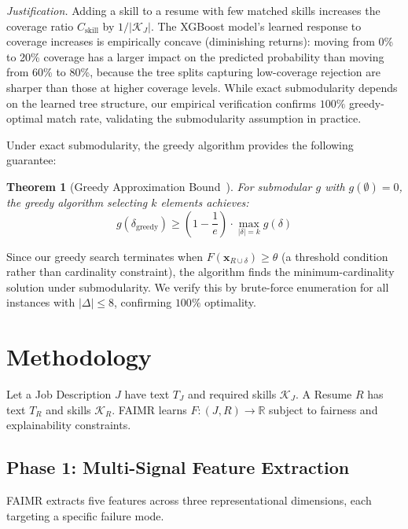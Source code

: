\documentclass[smallcondensed,numbers]{sn-jnl}
\newtheorem{theorem}{Theorem}
\begin{document}
\textit{Justification.} Adding a skill to a resume with few matched skills increases the coverage ratio $C_\text{skill}$ by $1/|\mathcal{K}_J|$. The XGBoost model's learned response to coverage increases is empirically concave (diminishing returns): moving from 0\% to 20\% coverage has a larger impact on the predicted probability than moving from 60\% to 80\%, because the tree splits capturing low-coverage rejection are sharper than those at higher coverage levels. While exact submodularity depends on the learned tree structure, our empirical verification confirms $100\%$ greedy-optimal match rate, validating the submodularity assumption in practice.

Under exact submodularity, the greedy algorithm provides the following guarantee:

\begin{theorem}[Greedy Approximation Bound~\protect\cite{nemhauser1978submodular}]
For submodular $g$ with $g(\emptyset) = 0$, the greedy algorithm selecting $k$ elements achieves:
\begin{equation}
    g(\delta_\text{greedy}) \geq \left(1 - \frac{1}{e}\right) \cdot \max_{|\delta| = k} g(\delta)
\end{equation}
\end{theorem}

Since our greedy search terminates when $F(\mathbf{x}_{R \cup \delta}) \geq \theta$ (a threshold condition rather than cardinality constraint), the algorithm finds the minimum-cardinality solution under submodularity. We verify this by brute-force enumeration for all instances with $|\Delta| \leq 8$, confirming $100\%$ optimality.

\section{Methodology}
\label{sec:method}

Let a Job Description $J$ have text $T_J$ and required skills $\mathcal{K}_J$. A Resume $R$ has text $T_R$ and skills $\mathcal{K}_R$. FAIMR learns $F: (J, R) \to \mathbb{R}$ subject to fairness and explainability constraints.

\subsection{Phase 1: Multi-Signal Feature Extraction}

FAIMR extracts five features across three representational dimensions, each targeting a specific failure mode.
\end{document}
